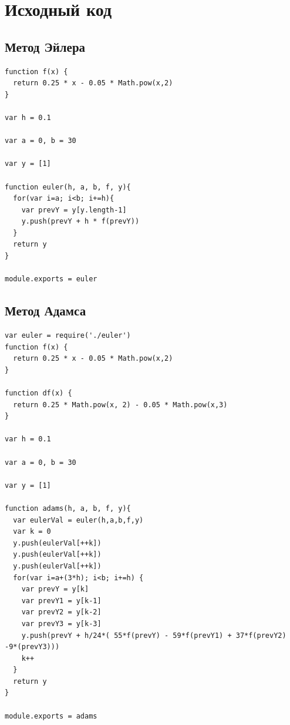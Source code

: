 \documentclass{article}
\begin{document}
\newpage
\section{Исходный код}
\subsection{Метод Эйлера}
\begin{lstlisting}
function f(x) {
  return 0.25 * x - 0.05 * Math.pow(x,2)
}

var h = 0.1

var a = 0, b = 30

var y = [1]

function euler(h, a, b, f, y){
  for(var i=a; i<b; i+=h){
    var prevY = y[y.length-1]
    y.push(prevY + h * f(prevY))
  }
  return y
}

module.exports = euler
\end{lstlisting}

\subsection{Метод Адамса}
\begin{lstlisting}
var euler = require('./euler')
function f(x) {
  return 0.25 * x - 0.05 * Math.pow(x,2)
}

function df(x) {
  return 0.25 * Math.pow(x, 2) - 0.05 * Math.pow(x,3)
}

var h = 0.1

var a = 0, b = 30

var y = [1]

function adams(h, a, b, f, y){
  var eulerVal = euler(h,a,b,f,y)
  var k = 0
  y.push(eulerVal[++k])
  y.push(eulerVal[++k])
  y.push(eulerVal[++k])
  for(var i=a+(3*h); i<b; i+=h) {
    var prevY = y[k]
    var prevY1 = y[k-1]
    var prevY2 = y[k-2]
    var prevY3 = y[k-3]
    y.push(prevY + h/24*( 55*f(prevY) - 59*f(prevY1) + 37*f(prevY2) -9*(prevY3)))
    k++
  }
  return y
}

module.exports = adams

\end{lstlisting}
\end{document}

